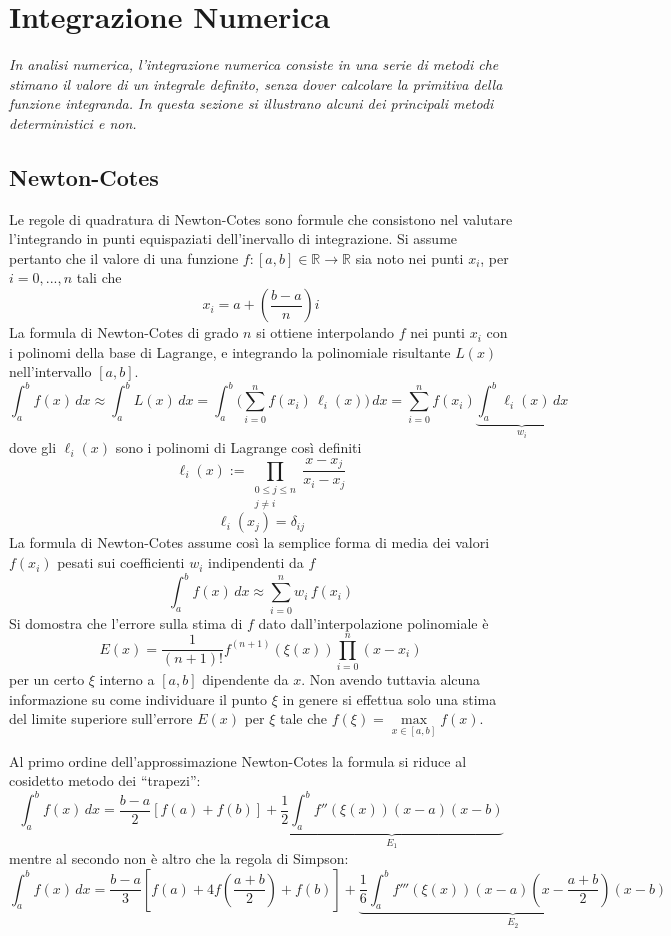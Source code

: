 \chapter{\huge Integrazione Numerica}

\textit{In analisi numerica, l'integrazione numerica consiste in una serie di metodi che stimano il valore di un integrale definito, senza dover calcolare la primitiva della funzione integranda. In questa sezione si illustrano alcuni dei principali metodi deterministici e non.}

\section{Newton-Cotes}
Le regole di quadratura di Newton-Cotes sono formule che consistono nel valutare l'integrando in punti equispaziati dell'inervallo di integrazione. Si assume pertanto che il valore di una funzione $f:[a,b]\in\mathbb{R}\rightarrow\mathbb{R}$ sia noto nei punti $x_i$, per $i=0,...,n$ tali che $$x_i=a+(\frac{b-a}{n})i$$
La formula di Newton-Cotes di grado $n$ si ottiene interpolando $f$ nei punti $x_i$ con i polinomi della base di Lagrange, e integrando la polinomiale risultante $L(x)$ nell'intervallo $[a,b]$.
$$ \int_a^b f(x) \,dx \approx \int_a^b L(x)\,dx = \int_a^b \bigl( \sum_{i=0}^n f(x_i)\, \ell_i(x) \bigr) \, dx = \sum_{i=0}^n f(x_i) \underbrace{\int_a^b \ell_i(x)\, dx}_{w_i} $$
dove gli $\ell_i(x)$ sono i polinomi di Lagrange così definiti
$$\ell_i(x):= \prod_{\begin{smallmatrix}0\le j\le n\\ j\neq i\end{smallmatrix}} \frac{x-x_j}{x_i-x_j}$$$$\ell_i(x_j)=\delta_{ij}$$
La formula di Newton-Cotes assume così la semplice forma di media dei valori $f(x_i)$ pesati sui coefficienti $w_i$ indipendenti da $f$
$$\int_a^b f(x) \,dx \approx \sum_{i=0}^n w_i\, f(x_i)$$
Si domostra che l'errore sulla stima di $f$ dato dall'interpolazione polinomiale è
$$E(x)=\frac{1}{(n+1)!}f^{(n+1)}(\xi(x))\prod_{i=0}^n(x-x_i)$$
per un certo $\xi$ interno a $[a,b]$ dipendente da $x$. Non avendo tuttavia alcuna informazione su come individuare il punto $\xi$ in genere si effettua solo una stima del limite superiore sull'errore $E(x)$ per $\xi$ tale che $f(\xi) = \underset{x\in[a,b]}{\max}f(x)$.

Al primo ordine dell'approssimazione Newton-Cotes la formula si riduce al cosidetto metodo dei ``trapezi'':
$$\int_a^b f(x) \,dx=\frac{b-a}{2}\left[ f(a)+f(b)\right] + \underbrace{\frac{1}{2}\int_a^b f''(\xi(x))(x-a)(x-b)}_{E_1}$$
mentre al secondo non è altro che la regola di Simpson:
$$\int_a^b f(x) \,dx=\frac{b-a}{3}\left[f(a)+4f(\frac{a+b}{2})+f(b)\right] + \underbrace{\frac{1}{6}\int_a^b f'''(\xi(x))(x-a)(x-\frac{a+b}{2})(x-b)}_{E_2}$$

